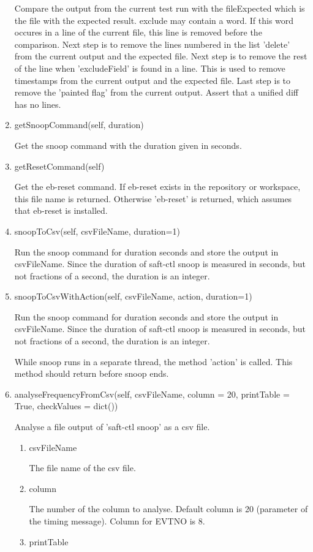 \documentclass[12pt,a4paper]{report}
\begin{document}
\begin{enumerate}
Compare the output from the current test run with the
fileExpected which is the file with the expected result. exclude may contain
a word. If this word occures in a line of the current file, this line is
removed before the comparison. Next step is to remove the lines numbered
in the list 'delete' from the current output and the expected file.
Next step is to remove the rest of the line when 'excludeField' is found
in a line. This is used to remove timestamps from the current output and
the expected file. Last step is to remove the 'painted flag'
from the current output. Assert that a unified diff has no lines.
\item getSnoopCommand(self, duration)

Get the snoop command with the duration given in seconds.

\item getResetCommand(self)

Get the eb-reset command. If eb-reset exists in the repository or
workspace, this file name is returned. Otherwise 'eb-reset' is returned,
which assumes that eb-reset is installed.

\item snoopToCsv(self, csvFileName, duration=1)

Run the snoop command for duration seconds and store the output in
csvFileName. Since the duration of saft-ctl snoop is measured in seconds,
but not fractions of a second, the duration is an integer.
\item snoopToCsvWithAction(self, csvFileName, action, duration=1)

Run the snoop command for duration seconds and store the output in
csvFileName. Since the duration of saft-ctl snoop is measured in seconds,
but not fractions of a second, the duration is an integer.

While snoop runs in a separate thread, the method 'action' is called.
This method should return before snoop ends.
\item analyseFrequencyFromCsv(self, csvFileName, column = 20, printTable
 = True, checkValues = dict())

Analyse a file output of 'saft-ctl snoop' as a csv file.
\begin{enumerate}
\item csvFileName

The file name of the csv file.
\item column

The number of the column to analyse. Default column is 20 (parameter of
the timing message). Column for EVTNO is 8.
\item printTable


\end{enumerate}
\end{enumerate}
\end{document}
